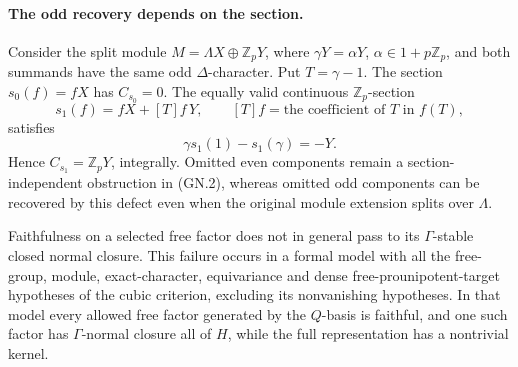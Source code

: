 \paragraph{The odd recovery depends on the section.}
Consider the split module
\(M=\Lambda X\oplus\mathbb Z_pY\), where
\(\gamma Y=\alpha Y\), \(\alpha\in1+p\mathbb Z_p\), and
both summands have the same odd \(\Delta\)-character. Put
\(T=\gamma-1\). The section \(s_0(f)=fX\) has \(C_{s_0}=0\).
The equally valid continuous \(\mathbb Z_p\)-section
\[
 s_1(f)=fX+[T]f\,Y,
 \qquad [T]f=\text{the coefficient of }T\text{ in }f(T),
\]
satisfies
\[
 \gamma s_1(1)-s_1(\gamma)=-Y.
 \tag{GN.4}
\]
Hence \(C_{s_1}=\mathbb Z_pY\), integrally. Omitted even
components remain a section-independent obstruction in (GN.2),
whereas omitted odd components can be recovered by this defect
even when the original module extension splits over \(\Lambda\).

\begin{proposition}
\label{prop:gamma-closure-countermodel}
Faithfulness on a selected free factor does not in general pass to
its \(\Gamma\)-stable closed normal closure. This failure occurs
in a formal model with all the free-group, module, exact-character,
equivariance and dense free-prounipotent-target hypotheses of the
cubic criterion, excluding its nonvanishing hypotheses. In that
model every allowed free factor generated by the \(Q\)-basis is
faithful, and one such factor has \(\Gamma\)-normal closure all
of \(H\), while the full representation has a nontrivial kernel.
\end{proposition}

